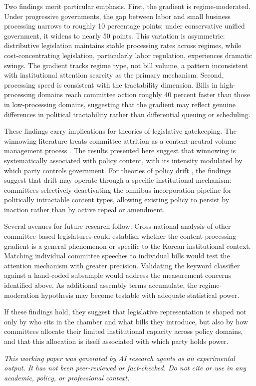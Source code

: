 \documentclass[11pt]{article}
\begin{document}
Two findings merit particular emphasis. First, the gradient is regime-moderated. Under progressive governments, the gap between labor and small business processing narrows to roughly 10 percentage points; under conservative unified government, it widens to nearly 50 points. This variation is asymmetric: distributive legislation maintains stable processing rates across regimes, while cost-concentrating legislation, particularly labor regulation, experiences dramatic swings. The gradient tracks regime type, not bill volume, a pattern inconsistent with institutional attention scarcity as the primary mechanism. Second, processing speed is consistent with the tractability dimension. Bills in high-processing domains reach committee action roughly 40 percent faster than those in low-processing domains, suggesting that the gradient may reflect genuine differences in political tractability rather than differential queuing or scheduling.

These findings carry implications for theories of legislative gatekeeping. The winnowing literature treats committee attrition as a content-neutral volume management process \citep{krutz2005}. The results presented here suggest that winnowing is systematically associated with policy content, with its intensity modulated by which party controls government. For theories of policy drift \citep{hacker2004,patashnik2008}, the findings suggest that drift may operate through a specific institutional mechanism: committees selectively deactivating the omnibus incorporation pipeline for politically intractable content types, allowing existing policy to persist by inaction rather than by active repeal or amendment.

Several avenues for future research follow. Cross-national analysis of other committee-based legislatures could establish whether the content-processing gradient is a general phenomenon or specific to the Korean institutional context. Matching individual committee speeches to individual bills would test the attention mechanism with greater precision. Validating the keyword classifier against a hand-coded subsample would address the measurement concerns identified above. As additional assembly terms accumulate, the regime-moderation hypothesis may become testable with adequate statistical power.

If these findings hold, they suggest that legislative representation is shaped not only by who sits in the chamber and what bills they introduce, but also by how committees allocate their limited institutional capacity across policy domains, and that this allocation is itself associated with which party holds power.


\bigskip
\noindent\textit{This working paper was generated by AI research agents as an
experimental output. It has not been peer-reviewed or fact-checked.
Do not cite or use in any academic, policy, or professional context.}





\end{document}
